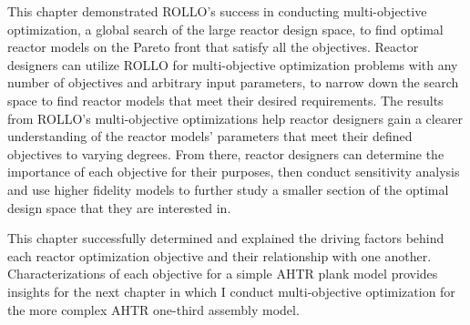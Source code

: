 This chapter demonstrated \gls{ROLLO}'s success in conducting multi-objective 
optimization, a global search of the large reactor design space, to find optimal reactor 
models on the Pareto front that satisfy all the objectives. 
Reactor designers can utilize \gls{ROLLO} for multi-objective optimization problems with 
any number of objectives and arbitrary input parameters, to narrow down the search space 
to find reactor models that meet their desired requirements. 
The results from \gls{ROLLO}'s multi-objective optimizations help reactor designers 
gain a clearer understanding of the reactor models' parameters that meet their defined 
objectives to varying degrees.
From there, reactor designers can determine the importance of each objective for 
their purposes, then conduct sensitivity analysis and use higher fidelity models to 
further study a smaller section of the optimal design space that they are 
interested in.

This chapter successfully determined and explained the driving factors behind 
each reactor optimization objective and their relationship with one another.  
Characterizations of each objective for a simple \gls{AHTR} plank model provides 
insights for the next chapter in which I conduct multi-objective optimization for 
the more complex \gls{AHTR} one-third assembly model. 
